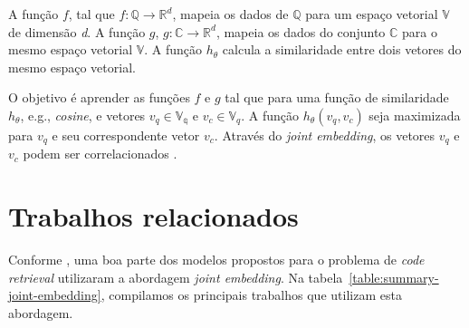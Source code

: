 A função $f$, tal que $f: \mathbb{Q} \rightarrow \mathbb{R}^{d}$, mapeia os dados de $\mathbb{Q}$ para um espaço vetorial $\mathbb{V}$ de dimensão \emph{d}. A função $g$, $g: \mathbb{C} \rightarrow \mathbb{R}^{d}$, mapeia os dados do conjunto $\mathbb{C}$ para o mesmo espaço vetorial $\mathbb{V}$. A função $h_{\theta}$ calcula a similaridade entre dois vetores do mesmo espaço vetorial.


O objetivo é aprender as funções $f$ e $g$ tal que para uma função de similaridade $h_{\theta}$, e.g., \textit{cosine}, e vetores $v_{q} \in \mathbb{V_q}$ e $v_{c} \in \mathbb{V}_q$. A função  $h_{\theta}(v_{q}, v_{c})$ seja maximizada para $v_{q}$ e seu correspondente vetor $v_{c}$.
Através do \textit{joint embedding}, os vetores $v_{q}$ e $v_{c}$ podem ser correlacionados \citep{Gu-deep-code-search:2018, cambronero-deep-learning-code-search:2019}.

    

\section{Trabalhos relacionados}\label{sec:code-retrieval-trabalhos-relacionados}

Conforme \cite{cambronero-deep-learning-code-search:2019}, uma boa parte dos modelos propostos para o problema de \textit{code retrieval} utilizaram a abordagem \textit{joint embedding}. Na tabela~\ref{table:summary-joint-embedding}, compilamos os principais trabalhos que utilizam esta abordagem. 


